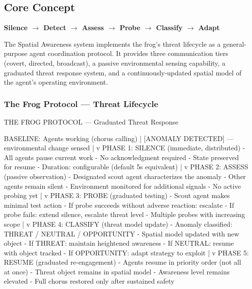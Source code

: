 \documentclass[11pt,letterpaper]{article}
\begin{document}
\subsection{Core Concept}

\textbf{Silence $\rightarrow$ Detect $\rightarrow$ Assess $\rightarrow$ Probe $\rightarrow$ Classify $\rightarrow$ Adapt}

The Spatial Awareness system implements the frog's threat lifecycle as a general-purpose agent coordination protocol. It provides three communication tiers (covert, directed, broadcast), a passive environmental sensing capability, a graduated threat response system, and a continuously-updated spatial model of the agent's operating environment.

\subsubsection{The Frog Protocol --- Threat Lifecycle}

\begin{asciibox}
THE FROG PROTOCOL — Graduated Threat Response

  BASELINE: Agents working (chorus calling)
       |
  [ANOMALY DETECTED] — environmental change sensed
       |
       v
  PHASE 1: SILENCE (immediate, distributed)
    - All agents pause current work
    - No acknowledgment required
    - State preserved for resume
    - Duration: configurable (default 5s equivalent)
       |
       v
  PHASE 2: ASSESS (passive observation)
    - Designated scout agent characterizes the anomaly
    - Other agents remain silent
    - Environment monitored for additional signals
    - No active probing yet
       |
       v
  PHASE 3: PROBE (graduated testing)
    - Scout agent makes minimal test action
    - If probe succeeds without adverse reaction: escalate
    - If probe fails: extend silence, escalate threat level
    - Multiple probes with increasing scope
       |
       v
  PHASE 4: CLASSIFY (threat model update)
    - Anomaly classified: THREAT / NEUTRAL / OPPORTUNITY
    - Spatial model updated with new object
    - If THREAT: maintain heightened awareness
    - If NEUTRAL: resume with object tracked
    - If OPPORTUNITY: adapt strategy to exploit
       |
       v
  PHASE 5: RESUME (graduated re-engagement)
    - Agents resume in priority order (not all at once)
    - Threat object remains in spatial model
    - Awareness level remains elevated
    - Full chorus restored only after sustained safety
\end{asciibox}
\end{document}
